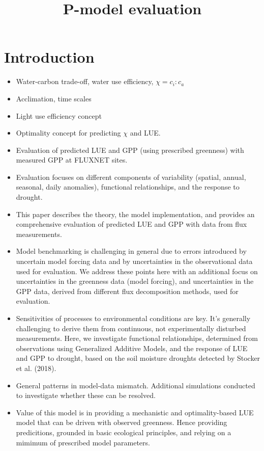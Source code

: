 \documentclass{myreport}
\begin{document}
\pagestyle{headings}

% 

\title{P-model evaluation}

\maketitle

\tableofcontents

\section{Introduction}

\begin{itemize}
    \item Water-carbon trade-off, water use efficiency, $\chi = c_i:c_a$
    \item Acclimation, time scales
    \item Light use efficiency concept
    \item Optimality concept for predicting $\chi$ and LUE.
    \item Evaluation of predicted LUE and GPP (using prescribed greenness) with measured GPP at FLUXNET sites.
    \item Evaluation focuses on different components of variability (spatial, annual, seasonal, daily anomalies), functional relationships, and the response to drought.
    \item This paper describes the theory, the model implementation, and provides an comprehensive evaluation of predicted LUE and GPP with data from flux measurements.
    \item Model benchmarking is challenging in general due to errors introduced by uncertain model forcing data and by uncertainties in the observational data used for evaluation. We address these points here with an additional focus on uncertainties in the greenness data (model forcing), and uncertainties in the GPP data, derived from different flux decomposition methods, used for evaluation. 
    \item Sensitivities of processes to environmental conditions are key. It's generally challenging to derive them from continuous, not experimentally disturbed measurements. Here, we investigate functional relationships, determined from observations using Generalized Additive Models, and the response of LUE and GPP to drought, based on the soil moisture droughts detected by Stocker et al. (2018).
    \item General patterns in model-data mismatch. Additional simulations conducted to investigate whether these can be resolved.
    \item Value of this model is in providing a mechanistic and optimality-based LUE model that can be driven with observed greenness. Hence providing predicitions, grounded in basic ecological principles, and relying on a mimimum of prescribed model parameters.
\end{itemize}
\end{document}
